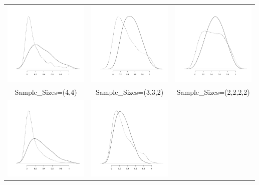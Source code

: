 \begin{appendix}
\begin{longtable}{ccc}
\hline
		\includegraphics[width=4.05cm]{Sim_Kendall-Kruskal_44_b.pdf} & 
		\includegraphics[width=4.05cm]{Sim_Kendall-Kruskal_332_b.pdf} & 
		\includegraphics[width=4.05cm]{Sim_Kendall-Kruskal_2222_a.pdf} \\ 
		           Sample\_Sizes=(4,4)  &  Sample\_Sizes=(3,3,2)  &   Sample\_Sizes=(2,2,2,2) \\  
\hline 
	\includegraphics[width=4.05cm]{Sim_Kendall-Kruskal_54_b.pdf} & 
		\includegraphics[width=4.05cm]{Sim_Kendall-Kruskal_333_b.pdf} & 

\end{longtable}
\end{appendix}
